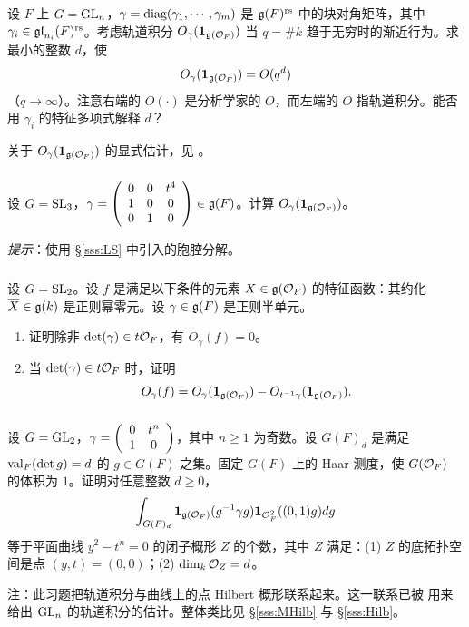 \subsubsection{} 设 $F$ 上 $G=\textup{GL}_{n}$，$\gamma=\textup{diag}(\gamma_{1},\cdots,\gamma_{m})$ 是 $\mathfrak{g}(F)^{\textup{rs}}$ 中的块对角矩阵，其中 $\gamma_{i}\in\mathfrak{gl}_{n_{i}}(F)^{\textup{rs}}$。考虑轨道积分 $O_{\gamma}(\mathbf{1}_{\mathfrak{g}(\mathcal{O}_{F})})$ 当 $q=\#k$ 趋于无穷时的渐近行为。求最小的整数 $d$，使
\begin{equation*}
O_{\gamma}(\mathbf{1}_{\mathfrak{g}(\mathcal{O}_{F})})=O(q^{d})
\end{equation*}
（$q\to\infty$）。注意右端的 $O(\cdot)$ 是分析学家的 $O$，而左端的 $O$ 指轨道积分。能否用 $\gamma_{i}$ 的特征多项式解释 $d$？

关于 $O_{\gamma}(\mathbf{1}_{\mathfrak{g}(\mathcal{O}_{F})})$ 的显式估计，见 \cite{Y-Orb}。

\subsubsection{} 设 $G=\textup{SL}_{3}$，$\gamma=\left(\begin{array}{ccc} 0 & 0 & t^{4}\\ 1 & 0 & 0 \\ 0 & 1& 0 \end{array}\right)\in\mathfrak{g}(F)$。计算 $O_{\gamma}(\mathbf{1}_{\mathfrak{g}(\mathcal{O}_{F})})$。

{\em 提示}：使用 \S\ref{sss:LS} 中引入的胞腔分解。

\subsubsection{} 设 $G=\textup{SL}_{2}$。设 $f$ 是满足以下条件的元素 $X\in\mathfrak{g}(\mathcal{O}_{F})$ 的特征函数：其约化 $\overline{X}\in\mathfrak{g}(k)$ 是正则幂零元。设 $\gamma\in\mathfrak{g}(F)$ 是正则半单元。
\begin{enumerate}
\item 证明除非 $\det(\gamma)\in t\mathcal{O}_{F}$，有 $O_{\gamma}(f)=0$。
\item 当 $\det(\gamma)\in t\mathcal{O}_{F}$ 时，证明
\begin{equation*}
O_{\gamma}(f)=O_{\gamma}(\mathbf{1}_{\mathfrak{g}(\mathcal{O}_{F})})-O_{t^{-1}\gamma}(\mathbf{1}_{\mathfrak{g}(\mathcal{O}_{F})}).
\end{equation*}
\end{enumerate}

\subsubsection{} 设 $G=\textup{GL}_{2}$，$\gamma=\left(\begin{array}{cc} 0 & t^{n} \\ 1 & 0 \end{array}\right)$，其中 $n\geq 1$ 为奇数。设 $G(F)_{d}$ 是满足 $\textup{val}_{F}(\det g)=d$ 的 $g\in G(F)$ 之集。固定 $G(F)$ 上的 Haar 测度，使 $G(\mathcal{O}_{F})$ 的体积为 $1$。证明对任意整数 $d\geq0$，
\begin{equation*}
\int_{G(F)_{d}}\mathbf{1}_{\mathfrak{g}(\mathcal{O}_{F})}(g^{-1}\gamma g)\mathbf{1}_{\mathcal{O}^{2}_{F}}((0,1)g)dg
\end{equation*}
等于平面曲线 $y^{2}-t^{n}=0$ 的闭子概形 $Z$ 的个数，其中 $Z$ 满足：(1) $Z$ 的底拓扑空间是点 $(y,t)=(0,0)$；(2) $\dim_{k}\mathcal{O}_{Z}=d$。

注：此习题把轨道积分与曲线上的点 Hilbert 概形联系起来。这一联系已被 \cite{Y-Orb} 用来给出 $\textup{GL}_{n}$ 的轨道积分的估计。整体类比见 \S\ref{sss:MHilb} 与 \S\ref{sss:Hilb}。
